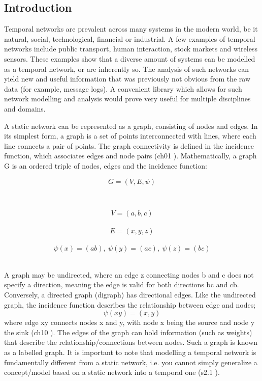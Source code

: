\begin{introduction}
\section{Introduction}
Temporal networks are prevalent across many systems in the modern world, be it natural, social, technological, financial or industrial. A few examples of temporal networks include public transport\cite{transport_example}, human interaction\cite{social_example}, stock markets\cite{stocks_example} and wireless sensors\cite{wireless_example}. These examples show that a diverse amount of systems can be modelled as a temporal network, or are inherently so. The analysis of such networks can yield new and useful information that was previously not obvious from the raw data (for example, message logs). A convenient library which allows for such network modelling and analysis would prove very useful for multiple disciplines and domains.

A static network can be represented as a graph, consisting of nodes and edges. In its simplest form, a graph is a set of points interconnected with lines, where each line connects a pair of points. The graph connectivity is defined in the incidence function, which associates edges and node pairs (ch01 \cite{graph_theory}). Mathematically, a graph G is an ordered triple of nodes, edges and the incidence function:

\begin{minipage}{0.4\textwidth}
    \begin{flushleft}
    \[ G = (V, E, \psi) \]
    \end{flushleft}
\end{minipage}
~
\begin{minipage}{0.4\textwidth}
    \begin{flushright}
    \[ V = (a, b, c) \] \\
    \[ E = (x, y, z) \] \\
    \[ \psi(x) = (ab),\ \psi(y) = (ac),\ \psi(z) = (bc) \]
    \end{flushright}
\end{minipage}\\[0.25cm]

A graph may be undirected, where an edge z connecting nodes b and c does not specify a direction, meaning the edge is valid for both directions bc and cb. Conversely, a directed graph (digraph) has directional edges. Like the undirected graph, the incidence function describes the relationship between edge and nodes;
\[ \psi(xy) = (x, y) \]
where edge xy connects nodes x and y, with node x being the source and node y the sink (ch10 \cite{graph_theory}). The edges of the graph can hold information (such as weights) that describe the relationship/connections between nodes. Such a graph is known as a labelled graph. It is important to note that modelling a temporal network is fundamentally different from a static network, i.e. you cannot simply generalize a concept/model based on a static network into a temporal one (s2.1 \cite{temporal_theory}).


\end{introduction}
